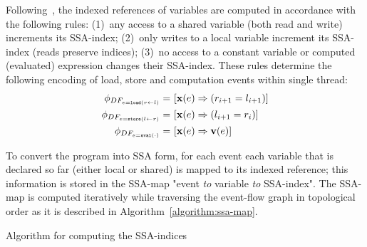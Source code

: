 Following~\cite{Porthos17b}, the indexed references of variables are computed in accordance with the following rules:
(1)~any access to a shared variable (both read and write) increments its SSA-index;
(2)~only writes to a local variable increment its SSA-index (reads preserve indices);
(3)~no access to a constant variable or computed (evaluated) expression changes their SSA-index.
These rules determine the following encoding of load, store and computation events within single thread:
%
\begin{align}
    \phi_{DF_{e = \texttt{load}(r \leftarrow l)}}  \defeq \ & [\fx(e) \Rightarrow (r_{i+1} = l_{i+1})] \\
    \phi_{DF_{e = \texttt{store}(l \leftarrow r)}} \defeq \ & [\fx(e) \Rightarrow (l_{i+1} = r_i)] \\
    \phi_{DF_{e = \texttt{eval}(\cdot)}}           \defeq \ & [\fx(e) \Rightarrow \fv(e)] %
\end{align}

To convert the program into SSA form, for each event each variable that is declared so far (either local or shared) is mapped to its indexed reference; this information is stored in the SSA-map "event \textit{to} variable \textit{to} SSA-index". %
The SSA-map is computed iteratively while traversing the event-flow graph in topological order as it is described in Algorithm~\ref{algorithm:ssa-map}.

\begin{algorithm}
    \caption{Algorithm for computing the SSA-indices}\label{alg:compute-ssa}
    \begin{algorithmic}[1]
                         
                        \EndIf
                    \EndFor
                \EndFor
            \EndFor
        \EndFunction
    \end{algorithmic}
    \label{algorithm:ssa-map}
\end{algorithm}

